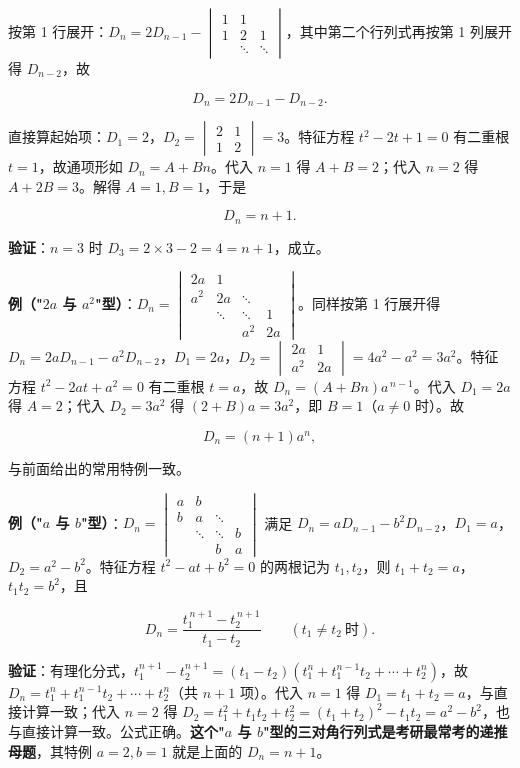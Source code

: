 \documentclass[11pt,openany,UTF8]{ctexbook}
\begin{document}
按第 1 行展开：$D_n=2D_{n-1}-\begin{vmatrix}1&1&\\1&2&1\\&\ddots&\ddots\end{vmatrix}$，其中第二个行列式再按第 1 列展开得 $D_{n-2}$，故

\[D_n=2D_{n-1}-D_{n-2}.\]

直接算起始项：$D_1=2$，$D_2=\begin{vmatrix}2&1\\1&2\end{vmatrix}=3$。特征方程 $t^2-2t+1=0$ 有二重根 $t=1$，故通项形如 $D_n=A+Bn$。代入 $n=1$ 得 $A+B=2$；代入 $n=2$ 得 $A+2B=3$。解得 $A=1,B=1$，于是

\[D_n=n+1 .\]

\textbf{验证}：$n=3$ 时 $D_3=2\times3-2=4=n+1$，成立。

\textbf{例（"$2a$ 与 $a^2$"型）}：$D_n=\begin{vmatrix}2a&1&&\\a^2&2a&\ddots&\\&\ddots&\ddots&1\\&&a^2&2a\end{vmatrix}$。同样按第 1 行展开得 $D_n=2aD_{n-1}-a^2D_{n-2}$，$D_1=2a$，$D_2=\begin{vmatrix}2a&1\\a^2&2a\end{vmatrix}=4a^2-a^2=3a^2$。特征方程 $t^2-2at+a^2=0$ 有二重根 $t=a$，故 $D_n=(A+Bn)a^{\,n-1}$。代入 $D_1=2a$ 得 $A=2$；代入 $D_2=3a^2$ 得 $(2+B)a=3a^2$，即 $B=1$（$a\ne0$ 时）。故

\[D_n=(n+1)a^n ,\]

与前面给出的常用特例一致。

\textbf{例（"$a$ 与 $b$"型）}：$D_n=\begin{vmatrix}a&b&&\\b&a&\ddots&\\&\ddots&\ddots&b\\&&b&a\end{vmatrix}$ 满足 $D_n=aD_{n-1}-b^2D_{n-2}$，$D_1=a$，$D_2=a^2-b^2$。特征方程 $t^2-at+b^2=0$ 的两根记为 $t_1,t_2$，则 $t_1+t_2=a$，$t_1t_2=b^2$，且

\[D_n=\frac{t_1^{\,n+1}-t_2^{\,n+1}}{t_1-t_2}\qquad(t_1\ne t_2\ \text{时}).\]

\textbf{验证}：有理化分式，$t_1^{n+1}-t_2^{n+1}=(t_1-t_2)\left(t_1^{n}+t_1^{n-1}t_2+\cdots+t_2^{n}\right)$，故 $D_n=t_1^n+t_1^{n-1}t_2+\cdots+t_2^n$（共 $n+1$ 项）。代入 $n=1$ 得 $D_1=t_1+t_2=a$，与直接计算一致；代入 $n=2$ 得 $D_2=t_1^2+t_1t_2+t_2^2=(t_1+t_2)^2-t_1t_2=a^2-b^2$，也与直接计算一致。公式正确。\textbf{这个"$a$ 与 $b$"型的三对角行列式是考研最常考的递推母题}，其特例 $a=2,b=1$ 就是上面的 $D_n=n+1$。
\end{document}

